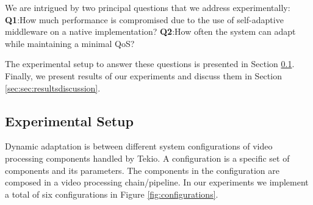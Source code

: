 \documentclass{acm_proc_article-sp}
\begin{document}
We are intrigued by two principal questions that we address experimentally:
\noindent \textbf{Q1}:How much performance is compromised due to the use of self-adaptive middleware on a native implementation?
\noindent \textbf{Q2}:How often the system can adapt while maintaining a minimal QoS?

The experimental setup to answer these questions is presented in Section \ref{sec:sec:experimentalsetup}. Finally, we present results of our experiments and discuss them in Section \ref{sec:sec:resultsdiscussion}.


\subsection{Experimental Setup}
\label{sec:sec:experimentalsetup}

Dynamic adaptation is between different system configurations of video processing components handled by Tekio. A configuration is a specific set of components and its parameters. The components in the configuration are composed in a video processing chain/pipeline. In our experiments we implement a total of six configurations in Figure \ref{fig:configurations}.
\end{document}
